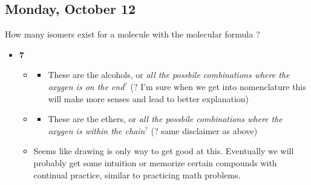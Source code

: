 \documentclass[12pt,a4paper]{article}
\begin{document}
\subsection{Monday, October 12}
\begin{enumerate}
    {\color{G-Moon}\item How many isomers exist for a molecule with the molecular formula ?}
        \begin{itemize}
            \item {\color{o-Sun}\textbf{7}}
                \begin{itemize}
                    \item {\tiny{}
                          \hspace{12pt}
                          \hspace{12pt}
                          \hspace{12pt}
                          }
                        \begin{itemize}
                            \item These are the alcohols, or {\color{y-Sun}\textit{all the possbile combinations where the oxygen is on the end}\(^{?}\)} ({\color{y-Sun}?} I'm sure when we get into nomenclature this will make more senses and lead to better explanation)
                        \end{itemize}
                    \item {\tiny{}
                          \hspace{12pt} 
                          \hspace{12pt} 
                          }
                        \begin{itemize}
                            \item These are the ethers, or {\color{y-Sun}\textit{all the possbile combinations where the oxygen is within the chain}\(^{?}\)} ({\color{y-Sun}?} same disclaimer as above)
                        \end{itemize}
                    \item Seems like drawing is only way to get good at this. Eventually we will probably get some intuition or memorize certain compounds with continual practice, similar to practicing math problems.

\end{itemize}
\end{itemize}
\end{enumerate}
\end{document}
